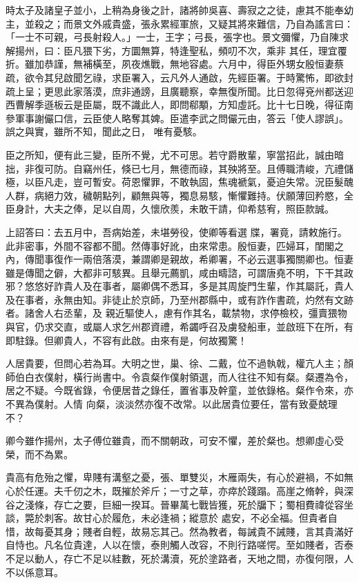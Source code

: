 \begin{pinyinscope}
 時太子及諸皇子並小，上稍為身後之計，諸將帥吳喜、壽寂之之徒，慮其不能奉幼主，並殺之；而景文外戚貴盛，張永累經軍旅，又疑其將來難信，乃自為謠言曰：「一士不可親，弓長射殺人。」一士，王字；弓長，張字也。景文彌懼，乃自陳求解揚州，曰：臣凡猥下劣，方圜無算，特逢聖私，頻叨不次，乘非
 其任，理宜覆折。雖加恭謹，無補橫至，夙夜燋戰，無地容處。六月中，得臣外甥女殷恒妻蔡疏，欲令其兒啟聞乞祿，求臣署入，云凡外人通啟，先經臣署。于時驚怖，即欲封疏上呈；更思此家落漠，庶非通謗，且廣聽察，幸無復所聞。比日忽得兗州都送迎西曹解季遜板云是臣屬，既不識此人，即問郗顒，方知虛託。比十七日晚，得征南參軍事謝儼口信，云臣使人略奪其婢。臣遣李武之問儼元由，答云「使人謬誤」。誤之與實，雖所不知，聞此之日，
 唯有憂駭。



 臣之所知，便有此三變，臣所不覺，尤不可思。若守爵散輩，寧當招此，誠由暗拙，非復可防。自竊州任，倏已七月，無德而祿，其殃將至。且傅職清峻，亢禮儲極，以臣凡走，豈可暫安。荷恩懼罪，不敢執固，焦魂褫氣，憂迫失常。況臣髮醜人群，病絕力效，穢朝點列，顧無與等，獨息易駭，慚懼難持。伏願薄回矜愍，全臣身計，大夫之俸，足以自周，久懷欣羨，未敢干請，仰希慈宥，照臣款誠。



 上詔答曰：去五月中，吾病始差，未堪勞役，使卿等看選
 牒，署竟，請敕施行。此非密事，外間不容都不聞。然傳事好訛，由來常患。殷恒妻，匹婦耳，閨閣之內，傳聞事復作一兩倍落漠，兼謂卿是親故，希卿署，不必云選事獨關卿也。恒妻雖是傳聞之僻，大都非可駭異。且舉元薦凱，咸由疇諮，可謂唐堯不明，下干其政邪？悠悠好詐貴人及在事者，屬卿偶不悉耳，多是其周旋門生輩，作其屬託，貴人及在事者，永無由知。非徒止於京師，乃至州郡縣中，或有詐作書疏，灼然有文跡者。諸舍人右丞輩，及
 親近驅使人，慮有作其名，載禁物，求停檢校，彊賣猥物與官，仍求交直，或屬人求乞州郡資禮，希蠲呼召及虜發船車，並啟班下在所，有即駐錄。但卿貴人，不容有此啟。由來有是，何故獨驚！



 人居貴要，但問心若為耳。大明之世，巢、徐、二戴，位不過執戟，權亢人主；顏師伯白衣僕射，橫行尚書中。令袁粲作僕射領選，而人往往不知有粲。粲遷為令，居之不疑。今既省錄，令便居昔之錄任，置省事及幹童，並依錄格。粲作令來，亦不異為僕射。人情
 向粲，淡淡然亦復不改常。以此居貴位要任，當有致憂兢理不？



 卿今雖作揚州，太子傅位雖貴，而不關朝政，可安不懼，差於粲也。想卿虛心受榮，而不為累。



 貴高有危殆之懼，卑賤有溝壑之憂，張、單雙災，木雁兩失，有心於避禍，不如無心於任運。夫千仞之木，既摧於斧斤；一寸之草，亦瘁於踐蹋。高崖之脩幹，與深谷之淺條，存亡之要，巨細一揆耳。晉畢萬七戰皆獲，死於牖下；蜀相費禕從容坐談，斃於刺客。故甘心於履危，未必逢禍；縱意於
 處安，不必全福。但貴者自惜，故每憂其身；賤者自輕，故易忘其己。然為教者，每誡貴不誡賤，言其貴滿好自恃也。凡名位貴達，人以在懷，泰則觸人改容，不則行路嗟愕。至如賤者，否泰不足以動人，存亡不足以絓數，死於溝瀆，死於塗路者，天地之間，亦復何限，人不以係意耳。




\end{pinyinscope}
